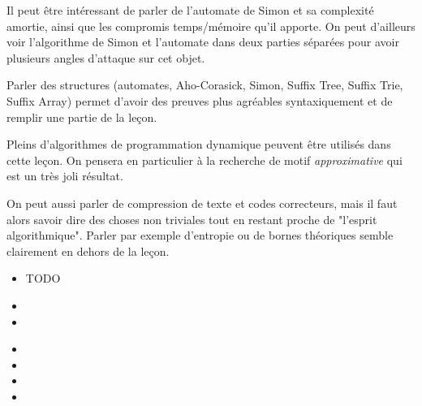 \documentclass{agregfiche}
\begin{document}
Il peut être intéressant de parler de l'automate de Simon et 
sa complexité amortie, ainsi que les compromis temps/mémoire
qu'il apporte. On peut d'ailleurs voir l'algorithme de Simon
et l'automate dans deux parties séparées pour avoir plusieurs 
angles d'attaque sur cet objet.

Parler des structures (automates, Aho-Corasick, Simon,
Suffix Tree, Suffix Trie, Suffix Array) permet d'avoir 
des preuves plus agréables syntaxiquement et de remplir 
une partie de la leçon.

Pleins d'algorithmes de programmation dynamique peuvent 
être utilisés dans cette leçon. On pensera en particulier 
à la recherche de motif \emph{approximative} qui est un 
très joli résultat.

On peut aussi parler de compression de texte et codes 
correcteurs, mais il faut
alors savoir dire des choses non triviales tout en restant 
proche de "l'esprit algorithmique". Parler par exemple 
d'entropie ou de bornes théoriques semble clairement 
en dehors de la leçon.

\secquestionsclassiques

\begin{itemize}
    \item TODO
\end{itemize}

\secreferences

\begin{itemize}
\item {}
\item {}
\end{itemize}

\secdev

\begin{itemize}
    \item {}
    \item {}
    \item {}
    \item {}
\end{itemize}
\end{document}
